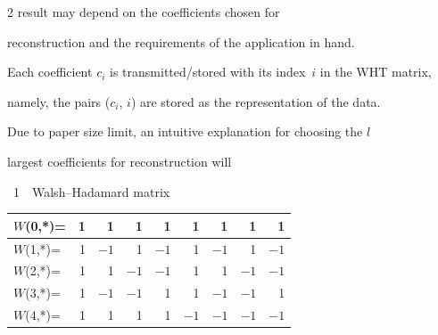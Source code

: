 \begin{multicols}{2}
result may depend on the coefficients chosen for

reconstruction and the requirements of the application in hand. 

Each coefficient $c_i$ is transmitted/stored with its index~$i$ in the WHT matrix, 

namely, the pairs ($c_i$, $i$) are stored as the representation of the data.



Due to paper size limit,  an intuitive explanation for choosing the $l$ 

largest coefficients   for reconstruction will\linebreak\vspace*{-12pt}





\pagebreak




{\small  %

\begin{center}

{{\tablename~1}\ \ \small{Walsh--Hadamard matrix}}

\end{center}



\tabcolsep=5.7pt

\begin{center}

\begin{tabular}{|l|r|r|r|r|r|r|r|r|}

\hline

$W$(0,*)= & 1 & 1 & 1 & 1 & 1 & 1 & 1 & 1\\

\hline

$W$(1,*)= & 1 &$-1$ & 1 &$-1$ & 1 &$-1$ & 1 &$-1$\\

\hline

$W$(2,*)= & 1 & 1 &$-1$ &$-1$ & 1 & 1 &$-1$ &$-1$\\

\hline

$W$(3,*)= & 1 &$-1$ &$-1$ & 1 & 1 &$-1$ &$-1$ & 1\\

\hline

$W$(4,*)= & 1 & 1 & 1 & 1 &$-1$ &$-1$ &$-1$ &$-1$\\


\end{tabular}
\end{center}}
\end{multicols}

